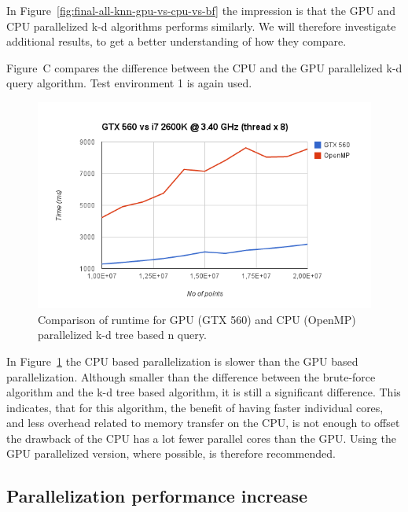 In Figure~\ref{fig:final-all-knn-gpu-vs-cpu-vs-bf} the impression is that the GPU and CPU parallelized k-d algorithms performs similarly. We will therefore investigate additional results, to get a better understanding of how they compare.

Figure~C compares the difference between the CPU and the GPU parallelized k-d query algorithm. Test environment 1 is again used.

\begin{figure}[ht!]
    \centering
    \includegraphics[width=120mm]{../gfx/v17-gpu-vs-cpu.png}
    \caption{Comparison of runtime for GPU (GTX 560) and CPU (OpenMP) parallelized k-d tree based n query.}
    \label{fig:v17-gpu-vs-cpu}
\end{figure}

In Figure~\ref{fig:v17-gpu-vs-cpu} the CPU based parallelization is slower than the GPU based parallelization. Although smaller than the difference between the brute-force algorithm and the k-d tree based algorithm, it is still a significant difference. This indicates, that for this algorithm, the benefit of having faster individual cores, and less overhead related to memory transfer on the CPU, is not enough to offset the drawback of the CPU has a lot fewer parallel cores than the GPU. Using the GPU parallelized version, where possible, is therefore recommended.

\subsection{Parallelization performance increase} %
\label{sub:parallelization_performance_increase}
 


